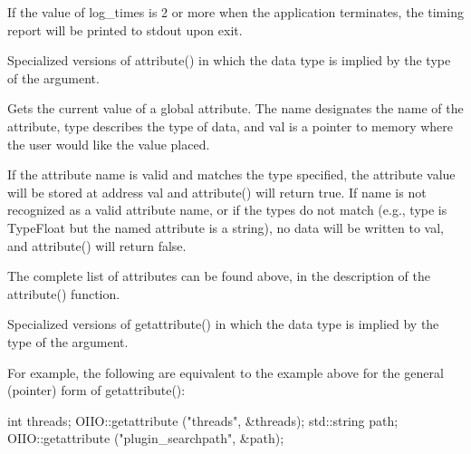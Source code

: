 If the value of {\cf log_times} is 2 or more when the application terminates,
the timing report will be printed to {\cf stdout} upon exit.
\apiend

\apiend


Specialized versions of {\cf attribute()} in which the data type is
implied by the type of the argument.
\apiend




Gets the current value of a global attribute.  The {\cf name} designates
the name of the attribute, {\cf type} describes the type of data, and
{\cf val} is a pointer to memory where the user would like the value
placed.

If the attribute name is valid and matches the type specified, the
attribute value will be stored at address {\cf val} and {\cf
  attribute()} will return {\cf true}.  If {\cf name} is not recognized
as a valid attribute name, or if the types do not match (e.g., {\cf
  type} is {\cf TypeFloat} but the named attribute is a
string), no data will be written to {\cf val}, and {\cf attribute()}
will return {\cf false}.

The complete list of attributes can be found above, in the description
of the {\cf attribute()} function.
\apiend

Specialized versions of {\cf getattribute()} in which the data type is
implied by the type of the argument.

For example, the following are equivalent to the example above for the
general (pointer) form of {\cf getattribute()}:

\begin{code}
      int threads;
      OIIO::getattribute ("threads", &threads);
      std::string path;
      OIIO::getattribute ("plugin_searchpath", &path);
\end{code}
\apiend

